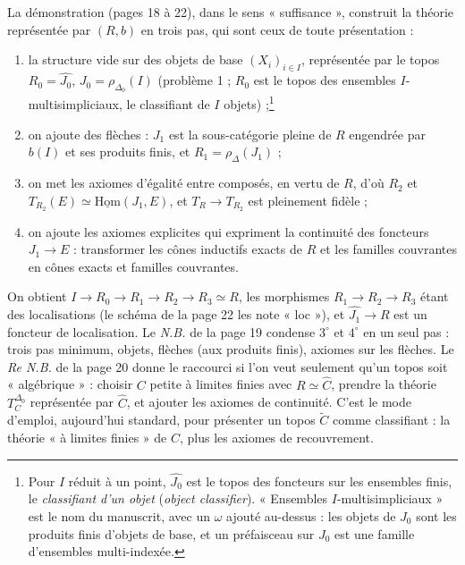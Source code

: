 \documentclass[11pt,a4paper]{article}
\begin{document}
La démonstration (pages 18 à 22), dans le sens « suffisance », construit la
théorie représentée par $(R, b)$ en trois pas, qui sont ceux de toute
présentation :
\begin{enumerate}
\item[$1^{\circ}$)] la structure vide sur des objets de base $(X_{i})_{i \in
I}$, représentée par le topos $R_{0} = \widehat{J_{0}}$, $J_{0} =
\rho_{\Delta_{0}}(I)$ (problème 1 ; $R_{0}$ est le topos des ensembles
$I$-multisimpliciaux, le classifiant de $I$ objets) ;\footnote{Pour $I$
réduit à un point, $\widehat{J_{0}}$ est le topos des foncteurs sur les
ensembles finis, le \emph{classifiant d'un objet} (\emph{object
classifier}). « Ensembles $I$-multisimpliciaux » est le nom du manuscrit,
avec un $\omega$ ajouté au-dessus : les objets de $J_{0}$ sont les produits
finis d'objets de base, et un préfaisceau sur $J_{0}$ est une famille
d'ensembles multi-indexée.}
\item[$2^{\circ}$)] on ajoute des flèches : $J_{1}$ est la sous-catégorie
pleine de $R$ engendrée par $b(I)$ et ses produits finis, et $R_{1} =
\rho_{\Delta}(J_{1})$ ;
\item[$3^{\circ}$)] on met les axiomes d'égalité entre composés, en vertu de
$R$, d'où $R_{2}$ et $T_{R_{2}}(E) \simeq \underline{\mathrm{Hom}}(J_{1},
E)$, et $T_{R} \to T_{R_{2}}$ est pleinement fidèle ;
\item[$4^{\circ}$)] on ajoute les axiomes explicites qui expriment la
continuité des foncteurs $J_{1} \to E$ : transformer les cônes inductifs
exacts de $R$ et les familles couvrantes en cônes exacts et familles
couvrantes.
\end{enumerate}
On obtient $I \to R_{0} \to R_{1} \to R_{2} \to R_{3} \simeq R$, les
morphismes $R_{1} \to R_{2} \to R_{3}$ étant des localisations (le
schéma de la page 22 les note « loc »), et $\widehat{J_{1}} \to R$ est un
foncteur de localisation. Le \emph{N.B.} de la page 19 condense $3^{\circ}$
et $4^{\circ}$ en un seul pas : trois pas minimum, objets, flèches (aux
produits finis), axiomes sur les flèches. Le \emph{Re N.B.} de la page 20
donne le raccourci si l'on veut seulement qu'un topos soit « algébrique » :
choisir $C$ petite à limites finies avec $R \simeq \widehat{C}$, prendre la
théorie $T^{\Delta_{0}}_{C}$ représentée par $\widehat{C}$, et ajouter les
axiomes de continuité. C'est le mode d'emploi, aujourd'hui standard, pour
présenter un topos $\widetilde{C}$ comme classifiant : la théorie « à
limites finies » de $C$, plus les axiomes de recouvrement.
\end{document}
